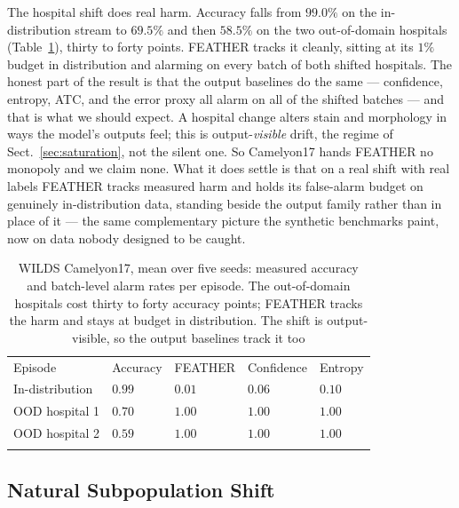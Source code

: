 \documentclass[acmsmall,screen]{acmart}
\providecommand{\svhline}{\hline}                        %
\theoremstyle{acmdefinition}
\begin{document}
The hospital shift does real harm. Accuracy falls from $99.0\%$ on the
in-distribution stream to $69.5\%$ and then $58.5\%$ on the two out-of-domain
hospitals (Table~\ref{tab:wilds}), thirty to forty points. FEATHER tracks it
cleanly, sitting at its $1\%$ budget in distribution and alarming on every
batch of both shifted hospitals. The honest part of the result is that the
output baselines do the same --- confidence, entropy, ATC, and the error proxy
all alarm on all of the shifted batches --- and that is what we should expect.
A hospital change alters stain and morphology in ways the model's outputs
feel; this is output-\emph{visible} drift, the regime of
Sect.~\ref{sec:saturation}, not the silent one. So Camelyon17 hands FEATHER no
monopoly and we claim none. What it does settle is that on a real shift with
real labels FEATHER tracks measured harm and holds its false-alarm budget on
genuinely in-distribution data, standing beside the output family rather than
in place of it --- the same complementary picture the synthetic benchmarks
paint, now on data nobody designed to be caught.

\begin{table}[!t]
\caption{WILDS Camelyon17, mean over five seeds: measured accuracy and
batch-level alarm rates per episode. The out-of-domain hospitals cost thirty
to forty accuracy points; FEATHER tracks the harm and stays at budget in
distribution. The shift is output-visible, so the output baselines track it
too}
\label{tab:wilds}
\begin{tabular}{p{3.4cm}p{1.7cm}p{1.7cm}p{1.7cm}p{1.7cm}}
\hline\noalign{\smallskip}
Episode & Accuracy & FEATHER & Confidence & Entropy \\
\noalign{\smallskip}\svhline\noalign{\smallskip}
In-distribution & $0.99$ & $0.01$ & $0.06$ & $0.10$ \\
OOD hospital 1 & $0.70$ & $1.00$ & $1.00$ & $1.00$ \\
OOD hospital 2 & $0.59$ & $1.00$ & $1.00$ & $1.00$ \\
\noalign{\smallskip}\hline\noalign{\smallskip}
\end{tabular}
\end{table}

\subsection{Natural Subpopulation Shift}
\label{sec:breeds}
\end{document}
